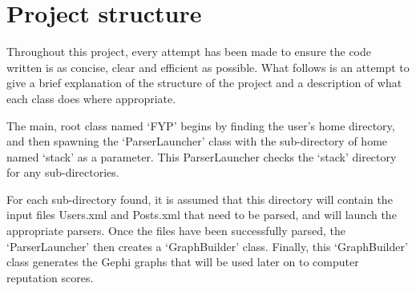 \documentclass[]{final_report}
\begin{document}

\section{Project structure}

Throughout this project, every attempt has been made to ensure the code written is as concise, clear and efficient as possible. What follows is an attempt to give a brief explanation of the structure of the project and a description of what each class does where appropriate. 

The main, root class named `FYP' begins by finding the user's home directory, and then spawning the `ParserLauncher' class with the sub-directory of home named `stack' as a parameter. This ParserLauncher checks the `stack' directory for any sub-directories. 

For each sub-directory found, it is assumed that this directory will contain the input files Users.xml and Posts.xml that need to be parsed, and will launch the appropriate parsers. Once the files have been successfully parsed, the `ParserLauncher' then creates a `GraphBuilder' class. Finally, this `GraphBuilder' class generates the Gephi graphs that will be used later on to computer reputation scores.
\end{document}
